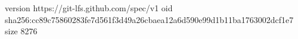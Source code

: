 version https://git-lfs.github.com/spec/v1
oid sha256:cc89c75860283fe7d561f3d49a26cbaea12a6d590e99d1b11ba1763002dcf1e7
size 8276
